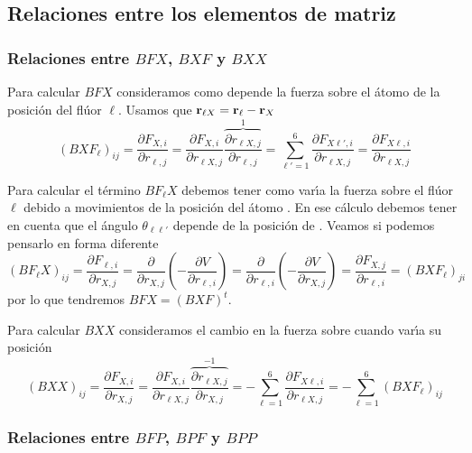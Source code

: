 \subsection{Relaciones entre los elementos de matriz}
\label{S:relaciones-elementos}


\subsubsection{Relaciones entre $BFX$, $BXF$ y $BXX$}
Para calcular $BFX$ consideramos como depende la fuerza sobre el \'{a}tomo   de la posici\'{o}n del fl\'{u}or $\ell$. 
Usamos que $\mathbf{r}_{\ell X} = \mathbf{r}_{\ell} - \mathbf{r}_{X}$
\begin{equation}
  \label{Q:BXF-1}
  (BXF_{\ell})_{ij} = \frac{\partial F_{X,i}}{\partial r_{\ell,j}} = \frac{\partial F_{X,i}}{\partial r_{\ell X,j}} \overbrace{\frac{\partial r_{\ell X,j}}{\partial r_{\ell,j}}}^{1} = \sum_{\ell'=1}^{6} \frac{\partial F_{X\ell',i}}{\partial r_{\ell X,j}} = \frac{\partial F_{X\ell,i}}{\partial r_{\ell X,j}}
\end{equation}

Para calcular el t\'{e}rmino $BF_{\ell}X$ debemos tener como var\'{\i}a la fuerza sobre el fl\'{u}or $\ell$ debido a movimientos de la posici\'{o}n del \'{a}tomo . En ese c\'{a}lculo debemos tener en cuenta que el \'{a}ngulo $\theta_{\ell \ell'} $ depende de la posici\'{o}n de .
Veamos si podemos pensarlo en forma diferente
\begin{equation}
  \label{Q:BFX-1}
  (BF_{\ell}X)_{ij} = \frac{\partial F_{\ell,i}}{\partial r_{X,j}} = \frac{\partial}{\partial r_{X,j}} \left(- \frac{\partial V}{\partial r_{\ell,i}}  \right) =
 \frac{\partial}{\partial r_{\ell,i}} \left(- \frac{\partial V}{\partial r_{X,j}}  \right) =  \frac{\partial F_{X,j}}{\partial r_{\ell,i}} = (BXF_{\ell})_{ji}
\end{equation}
por lo que tendremos $BFX=(BXF)^{t}$.

Para calcular $BXX$ consideramos el cambio en la fuerza sobre  cuando var\'{\i}a su posici\'{o}n
\begin{equation}
  \label{Q:BXX-1}
  (BXX)_{ij} = \frac{\partial F_{X,i}}{\partial r_{X,j}} = \frac{\partial F_{X,i}}{\partial r_{\ell X,j}} \overbrace{\frac{\partial r_{\ell X,j}}{\partial r_{X,j}}}^{-1} = - \sum_{\ell=1}^{6} \frac{\partial F_{X\ell,i}}{\partial r_{\ell X,j}} = -\sum_{\ell=1}^{6} (BXF_{\ell})_{ij}
\end{equation}

\subsubsection{Relaciones entre $BFP$, $BPF$ y $BPP$}


